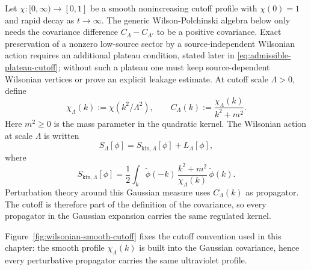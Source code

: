 Let \(\chi:[0,\infty)\to[0,1]\) be a smooth nonincreasing cutoff profile with
\(\chi(0)=1\) and rapid decay as \(t\to\infty\).  The generic
Wilson-Polchinski algebra below only needs the covariance difference
\(C_\Lambda-C_{\Lambda'}\) to be a positive covariance.  Exact preservation of
a nonzero low-source sector by a source-independent Wilsonian action requires
an additional plateau condition, stated later in
\eqref{eq:admissible-plateau-cutoff}; without such a plateau one must keep
source-dependent Wilsonian vertices or prove an explicit leakage estimate.
At cutoff scale \(\Lambda>0\), define
\[
  \chi_\Lambda(k):=\chi(k^2/\Lambda^2),
  \qquad
  C_\Lambda(k):=\frac{\chi_\Lambda(k)}{k^2+m^2}.
\]
Here \(m^2\geq0\) is the mass parameter in the quadratic kernel.  The
Wilsonian action at scale \(\Lambda\) is written
\begin{equation}
  S_\Lambda[\phi]
  =
  S_{\mathrm{kin},\Lambda}[\phi]+L_\Lambda[\phi],
  \label{eq:wilsonian-action-split}
\end{equation}
where
\begin{equation}
  S_{\mathrm{kin},\Lambda}[\phi]
  =
  \frac12\int_k
  \widetilde\phi(-k)\,
  \frac{k^2+m^2}{\chi_\Lambda(k)}\,
  \widetilde\phi(k).
  \label{eq:smooth-cutoff-kinetic-term}
\end{equation}
Perturbation theory around this Gaussian measure uses \(C_\Lambda(k)\) as
propagator.  The cutoff is therefore part of the definition of the covariance,
so every propagator in the Gaussian expansion carries the same regulated
kernel.

Figure~\ref{fig:wilsonian-smooth-cutoff} fixes the cutoff convention used in
this chapter: the smooth profile \(\chi_\Lambda(k)\) is built into the Gaussian
covariance, hence every perturbative propagator carries the same ultraviolet
profile.

